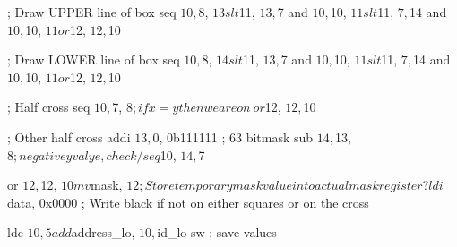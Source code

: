\documentclass[../main/report.tex]{subfiles}
\begin{document}
\begin{assembly}[label=lst:tunnel-kernel3, firstnumber=98]
; Draw UPPER line of box
seq $10, $8, $13

slt $11, $13, $7
and $10, $10, $11

slt $11, $7, $14
and $10, $10, $11

or $12, $12, $10

; Draw LOWER line of box
seq $10, $8, $14

slt $11, $13, $7
and $10, $10, $11

slt $11, $7, $14
and $10, $10, $11

or $12, $12, $10


; Half cross
seq $10, $7, $8     ; if x = y then we are on \

or $12, $12, $10

; Other half cross
addi $13, $0, 0b111111      ; 63 bitmask
sub $14, $13, $8    ; negative y valye, check /

seq $10, $14, $7

or $12, $12, $10

mv $mask, $12       ; Store temporary mask value into actual mask register

? ldi $data, 0x0000 ; Write black if not on either squares or on the cross

ldc $10, 5
add $address_lo, $10, $id_lo
sw                  ; save values
\end{assembly}
\end{document}
